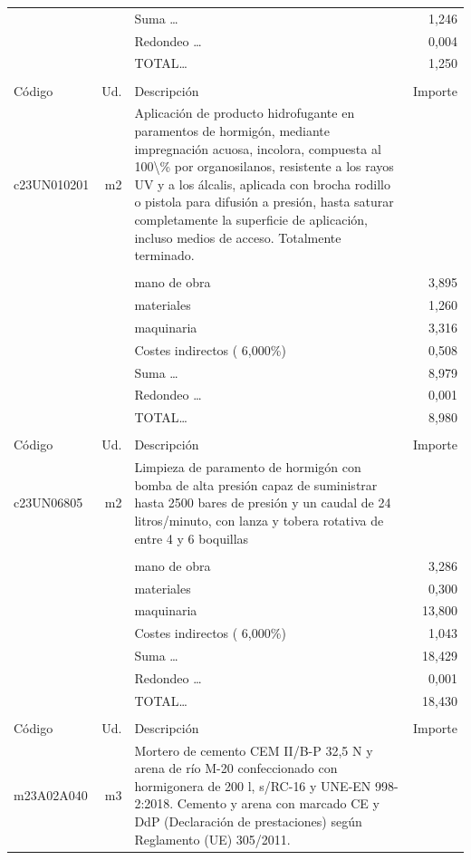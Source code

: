 \begin{supertabular}{l r p{60mm} r}
&&Suma \ldots&     1,246\\%
&&Redondeo \ldots&     0,004\\%
%
&&TOTAL\ldots&     1,250\\%
&&&\\%
Código&Ud.&Descripción&Importe\\%
\hline%
c23UN010201&m2&Aplicación de producto hidrofugante en paramentos de hormigón, mediante impregnación acuosa, incolora, compuesta al 100\textbackslash{}\% por organosilanos, resistente a los rayos UV y a los álcalis, aplicada con brocha rodillo o pistola para difusión a presión, hasta saturar completamente la superficie de aplicación, incluso medios de acceso. Totalmente terminado.&\\%
&&&\\%
&&mano de obra&     3,895\\%
&&materiales&     1,260\\%
&&maquinaria&     3,316\\%
&&Costes indirectos (     6,000\%)&     0,508\\%
&&Suma \ldots&     8,979\\%
&&Redondeo \ldots&     0,001\\%
%
&&TOTAL\ldots&     8,980\\%
&&&\\%
Código&Ud.&Descripción&Importe\\%
\hline%
c23UN06805&m2&Limpieza de paramento de hormigón con bomba de alta presión capaz de suministrar hasta 2500 bares de presión y un caudal de 24 litros/minuto, con lanza y tobera rotativa de entre 4 y 6 boquillas&\\%
&&&\\%
&&mano de obra&     3,286\\%
&&materiales&     0,300\\%
&&maquinaria&    13,800\\%
&&Costes indirectos (     6,000\%)&     1,043\\%
&&Suma \ldots&    18,429\\%
&&Redondeo \ldots&     0,001\\%
%
&&TOTAL\ldots&    18,430\\%
&&&\\%
Código&Ud.&Descripción&Importe\\%
\hline%
m23A02A040&m3&Mortero de cemento CEM II/B{-}P 32,5 N y arena de río M{-}20 confeccionado con hormigonera de 200 l, s/RC{-}16 y UNE{-}EN 998{-}2:2018. Cemento y arena con marcado CE y DdP (Declaración de prestaciones) según Reglamento (UE) 305/2011.&\\%

\end{supertabular}
